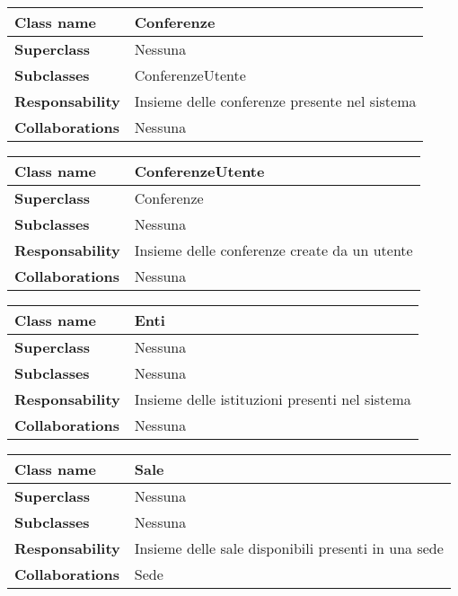 \begin{table}[h!]
	\begin{tabular}{|l|l|}
		\hline 
		\textbf{Class name} & Conferenze
		\\ \hline
		\textbf{Superclass} & Nessuna
		\\ \hline
		\multirow{1}{*}{\textbf{Subclasses}} & ConferenzeUtente \\ \hline
		\textbf{Responsability} & Insieme delle conferenze presente nel sistema
		\\ \hline
		\multirow{1}{*}{\textbf{Collaborations}} & Nessuna
		\\ \hline
	\end{tabular}
\end{table}
\begin{table}[h!]
	\begin{tabular}{|l|l|}
		\hline 
		\textbf{Class name} & ConferenzeUtente
		\\ \hline
		\textbf{Superclass} & Conferenze
		\\ \hline
		\multirow{1}{*}{\textbf{Subclasses}} & Nessuna
		\\ \hline
		\textbf{Responsability} & Insieme delle conferenze create da un utente
		\\ \hline
		\multirow{1}{*}{\textbf{Collaborations}} & Nessuna
		\\ \hline
	\end{tabular}
\end{table}

\begin{table}[h!]
	\begin{tabular}{|l|l|}
		\hline 
		\textbf{Class name} & Enti
		\\ \hline
		\textbf{Superclass} & Nessuna
		\\ \hline
		\multirow{1}{*}{\textbf{Subclasses}} & Nessuna
		\\ \hline
		\textbf{Responsability} & Insieme delle istituzioni presenti nel sistema
		\\ \hline
		\multirow{1}{*}{\textbf{Collaborations}} & Nessuna
		\\ \hline
	\end{tabular}
\end{table}

\begin{table}[h!]
	\begin{tabular}{|l|l|}
		\hline 
		\textbf{Class name} & Sale
		\\ \hline
		\textbf{Superclass} & Nessuna
		\\ \hline
		\multirow{1}{*}{\textbf{Subclasses}} & Nessuna
		\\ \hline
		\textbf{Responsability} & Insieme delle sale disponibili presenti in una sede
		\\ \hline
		\multirow{1}{*}{\textbf{Collaborations}} & Sede
		\\ \hline
	\end{tabular}
\end{table}

